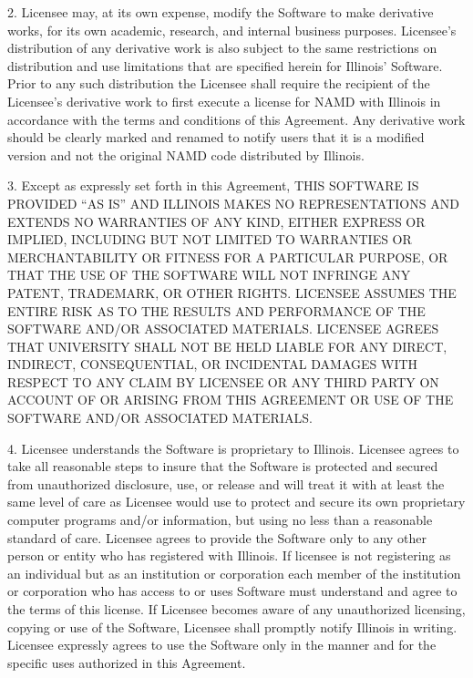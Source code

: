 2. Licensee may, at its own expense, modify the Software to make derivative
works, for its own academic, research, and internal business purposes.
Licensee's distribution of any derivative work is also subject to the same
restrictions on distribution and use limitations that are specified herein
for Illinois' Software. Prior to any such distribution the Licensee shall 
require the recipient of the Licensee's derivative work to first execute a 
license for NAMD with Illinois in accordance with the terms and conditions 
of this Agreement. Any derivative work should be clearly marked and 
renamed to notify users that it is a modified version and not the original 
NAMD code distributed by Illinois.

3. Except as expressly set forth in this Agreement, THIS SOFTWARE IS 
PROVIDED ``AS IS'' AND ILLINOIS MAKES NO REPRESENTATIONS AND EXTENDS NO 
WARRANTIES OF ANY KIND, EITHER EXPRESS OR IMPLIED, INCLUDING BUT NOT 
LIMITED TO WARRANTIES OR MERCHANTABILITY OR FITNESS FOR A PARTICULAR 
PURPOSE, OR THAT THE USE OF THE SOFTWARE WILL NOT INFRINGE ANY PATENT, 
TRADEMARK, OR OTHER RIGHTS. LICENSEE ASSUMES THE ENTIRE RISK AS TO 
THE RESULTS AND PERFORMANCE OF THE SOFTWARE AND/OR ASSOCIATED MATERIALS. 
LICENSEE AGREES THAT UNIVERSITY SHALL NOT BE HELD LIABLE FOR ANY DIRECT, 
INDIRECT, CONSEQUENTIAL, OR INCIDENTAL DAMAGES WITH RESPECT TO ANY 
CLAIM BY LICENSEE OR ANY THIRD PARTY ON ACCOUNT OF OR ARISING FROM 
THIS AGREEMENT OR USE OF THE SOFTWARE AND/OR ASSOCIATED MATERIALS.

4. Licensee understands the Software is proprietary to Illinois. 
Licensee agrees to take all reasonable steps to insure that the Software 
is protected and secured from unauthorized disclosure, use, or release 
and will treat it with at least the same level of care as Licensee would 
use to protect and secure its own proprietary computer programs and/or 
information, but using no less than a reasonable standard of care. 
Licensee agrees to provide the Software only to any other person or 
entity who has registered with Illinois. If licensee is not registering 
as an individual but as an institution or corporation each member of 
the institution or corporation who has access to or uses Software must 
understand and agree to the terms of this license. If Licensee becomes 
aware of any unauthorized licensing, copying or use of the Software, 
Licensee shall promptly notify Illinois in writing. Licensee expressly 
agrees to use the Software only in the manner and for the specific uses 
authorized in this Agreement.

